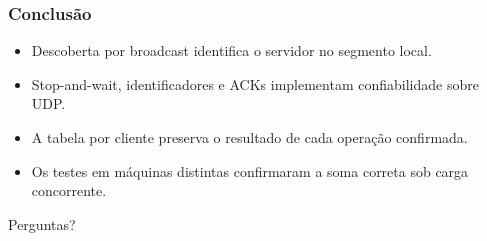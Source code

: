 \documentclass{beamer}
\begin{document}
\begin{frame}
  \frametitle{Conclusão}
  \begin{itemize}
    \item Descoberta por broadcast identifica o servidor no segmento local.
    \item Stop-and-wait, identificadores e ACKs implementam confiabilidade sobre UDP.
    \item A tabela por cliente preserva o resultado de cada operação confirmada.
    \item Os testes em máquinas distintas confirmaram a soma correta sob carga concorrente.
  \end{itemize}

  \vspace{1.4em}
  \begin{center}
    \large Perguntas?
  \end{center}
\end{frame}
\end{document}
